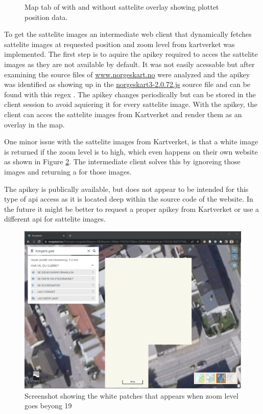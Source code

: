 \begin{figure}[H]
    \caption{Map tab of \srgui with and without sattelite overlay showing plottet position data.}
    \label{fig:gui_map}
\end{figure}

To get the sattelite images an intermediate web client that dynamically fetches sattelite images at requested position and zoom level from kartverket was implemented.
The first step is to aquire the \gls{apikey} required to acces the sattelite images as they are not available by default.
It was not easily acessable but after examining the source files of \href{https://www.norgeskart.no}{www.norgeskart.no} were analyzed and the \gls{apikey} was identified as showing up in the \href{https://www.norgeskart.no/norgeskart3-2.0.72.js}{norgeskart3-2.0.72.js} source file and can be found with this regex .
The \gls{apikey} changes periodically but can be stored in the client session to avoid aquiering it for every sattelite image.
With the \gls{apikey}, the client can acces the sattelite images from Kartverket and render them as an overlay in the map.

One minor issue with the sattelite images from Kartverket, is that a white image is returned if the zoom level is to high, which even happens on their own website as shown in Figure \ref{fig:norgeskart_bug}.
The intermediate client solves this by ignoreing those images and returning a  for those images.

The \gls{apikey} is publically available, but does not appear to be intended for this type of \gls{api} access as it is located deep within the source code of the website.
In the future it might be better to request a proper \gls{apikey} from Kartverket or use a different \gls{api} for sattelite images.

\begin{figure}[H]
    \centering
    \includegraphics[width=.8\textwidth]{figures/gui/norgeskart_bug.png}
    \caption{Screenshot showing the white patches that appears when zoom level goes beyong 19 \cite{kartverketNorgeskart}}
    \label{fig:norgeskart_bug}
\end{figure}
